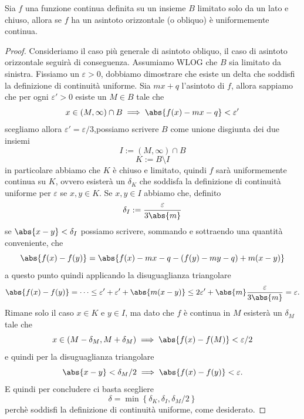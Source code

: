 \documentclass[11pt]{scrartcl}
\begin{document}
	\begin{theorem}
		Sia $f$ una funzione continua definita su un insieme $B$ limitato solo da un lato e chiuso, allora se $f$ ha un asintoto orizzontale (o obliquo) è uniformemente continua.
	\end{theorem}
	\begin{proof}
		Consideriamo il caso più generale di asintoto obliquo, il caso di asintoto orizzontale seguirà di conseguenza. Assumiamo WLOG che $B$ sia limitato da sinistra. Fissiamo un $\varepsilon>0$, dobbiamo dimostrare che esiste un delta che soddisfi la definizione di continuità uniforme. Sia $mx+q$ l'asintoto di $f$, allora sappiamo che per ogni $\varepsilon'>0$ esiste un $M\in B$ tale che 
		$$x\in (M,\infty)\cap B \implies \abs{f(x)-mx-q}<\varepsilon'$$
		scegliamo allora $\varepsilon'=\varepsilon/3$,possiamo scrivere $B$ come unione disgiunta dei due insiemi
		$$I:=(M,\infty)\cap B$$
		$$K:=B\setminus I$$ 
		in particolare abbiamo che $K$ è chiuso e limitato, quindi $f$ sarà uniformemente continua su $K$, ovvero esisterà un $\delta_K$ che soddisfa la definizione di continuità uniforme per $\varepsilon$ se $x,y\in K$. Se $x,y\in I$ abbiamo che, definito $$\delta_I:=\frac{\varepsilon}{3\abs{m}}$$
		se $\abs{x-y}<\delta_I$ possiamo scrivere, sommando e sottraendo una quantità conveniente, che 
		$$\abs{f(x)-f(y)}=\abs{f(x)-mx-q-\left(f(y)-my-q\right)+m(x-y)}$$
		a questo punto quindi applicando la disuguaglianza triangolare
		$$\abs{f(x)-f(y)}=\dots\le \varepsilon'+\varepsilon'+\abs{m(x-y)}\le2\varepsilon'+\abs{m}\frac{\varepsilon}{3\abs{m}}=\varepsilon.$$
		Rimane solo il caso $x\in K$ e $y\in I$, ma dato che $f$ è continua in $M$ esisterà un $\delta_M$ tale che 
		$$x\in (M-\delta_M,M+\delta_M) \implies \abs{f(x)-f(M)}<\varepsilon/2$$
		e quindi per la disuguaglianza triangolare
		$$\abs{x-y}<\delta_M/2 \implies \abs{f(x)-f(y)}<\varepsilon.$$
		E quindi per concludere ci basta scegliere 
		$$\delta=\min\left\{\delta_K,\delta_I,\delta_M/2\right\}$$
		perchè soddisfi la definizione di continuità uniforme, come desiderato.
	\end{proof}
\end{document}
